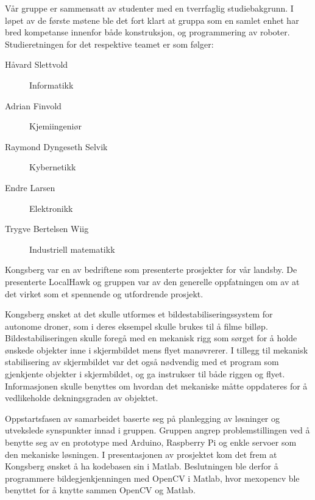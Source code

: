 Vår gruppe er sammensatt av studenter med en tverrfaglig studiebakgrunn. I løpet av de første møtene ble det fort klart at gruppa som en samlet enhet har bred kompetanse innenfor både konstruksjon, og programmering av roboter. Studieretningen for det respektive teamet er som følger:

\begin{description}
	\item[Håvard Slettvold] Informatikk
	\item[Adrian Finvold] Kjemiingeniør
	\item[Raymond Dyngeseth Selvik] Kybernetikk
	\item[Endre Larsen] Elektronikk
	\item[Trygve Bertelsen Wiig] Industriell matematikk
\end{description}

Kongsberg var en av bedriftene som presenterte prosjekter for vår landsby. De presenterte LocalHawk og gruppen var av den generelle oppfatningen om av at det virket som et spennende og utfordrende prosjekt. 

Kongsberg ønsket at det skulle utformes et bildestabiliseringssystem for autonome droner, som i deres eksempel skulle brukes til å filme billøp. Bildestabiliseringen skulle foregå med en mekanisk rigg som sørget for å holde ønskede objekter inne i skjermbildet mens flyet manøvrerer. I tillegg til mekanisk stabilisering av skjermbildet var det også nødvendig med et program som gjenkjente objekter i skjermbildet, og ga instrukser til både riggen og flyet. Informasjonen skulle benyttes om hvordan det mekaniske måtte oppdateres for å vedlikeholde dekningsgraden av objektet. 

Oppstartsfasen av samarbeidet baserte seg på planlegging av løsninger og utvekslede synspunkter innad i gruppen. Gruppen angrep problemstillingen ved å benytte seg av en prototype med Arduino, Raspberry Pi og enkle servoer som den mekaniske løsningen. I presentasjonen av prosjektet kom det frem at Kongsberg ønsket å ha kodebasen sin i Matlab. Beslutningen ble derfor å programmere bildegjenkjenningen med OpenCV i Matlab, hvor mexopencv ble benyttet for å knytte sammen OpenCV og Matlab.